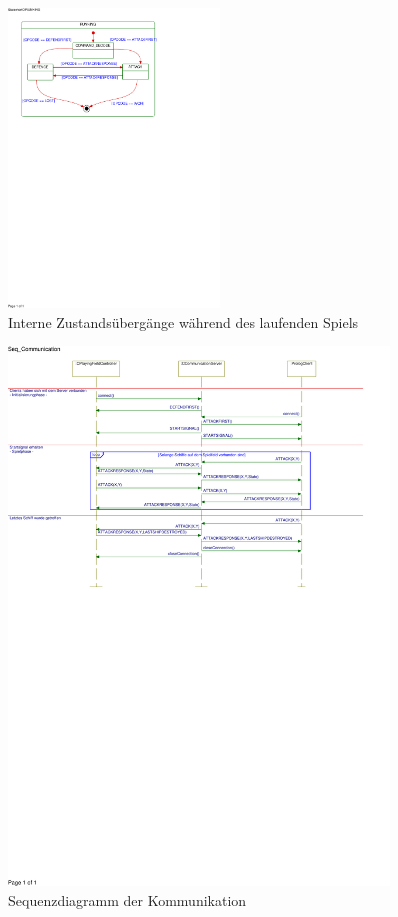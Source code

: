 \begin{figure}[H]
  \centering
  \includegraphics[trim=10mm 185mm 60mm 10mm,clip,width=0.5\textwidth]{images/SubSMRUNNING.pdf}
  \caption{Interne Zustandsübergänge während des laufenden Spiels}
  \label{fig:SubClientstates}
\end{figure}


\begin{figure}[H]
  \centering
  \includegraphics[trim=0mm 160mm 25mm 5mm,clip,width=0.9\textwidth]{images/SeqCommunication.pdf}
  \caption{Sequenzdiagramm der Kommunikation}
  \label{fig:Kommunikationssequenz}
\end{figure}

